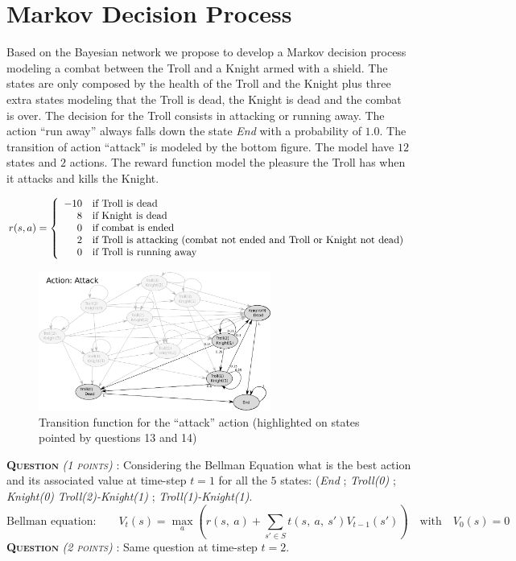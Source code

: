 \documentclass[a4paper, 10pt]{article}
\newcounter{QQ}
\newcommand{\question}[1]{ \medskip \sffamily \textsc{\textbf{\large Question \stepcounter{QQ} \arabic{QQ}} \emph{\small(#1)}} : }
\begin{document}
\section{Markov Decision Process}
  
  Based on the Bayesian network we propose to develop a Markov decision process modeling a combat between the Troll and a Knight armed with a shield.
  The states are only composed by the health of the Troll and the Knight plus three extra states modeling that the Troll is dead, the Knight is dead and the combat is over.
  The decision for the Troll consists in attacking or running away.
  The action ``run away'' always falls down the state \emph{End} with a probability of $1.0$.
  The transition of action ``attack'' is modeled by the bottom figure. 
  The model have $12$ states and $2$ actions.
  The reward function model the pleasure the Troll has when it attacks and kills the Knight.
  
  $$ r(s, a)= \left\{
  \begin{array}{r l}
      -10  & \text{if Troll is dead} \\
      8    & \text{if Knight is dead} \\
      0    & \text{if combat is ended} \\
      2    & \text{if Troll is attacking (combat not ended and Troll or Knight not dead)} \\
      0    & \text{if Troll is running away}
   \end{array}
   \right.$$

   \begin{figure}[!b]
    \centering
    \includegraphics[width=0.68\textwidth]{fig/Attacking}
    \caption{Transition function for the ``attack'' action (highlighted on states pointed by questions 13 and 14)}
   \end{figure}

\question{1 points}
  Considering the Bellman Equation what is the best action and its associated value at time-step $t=1$ for all the $5$ states:
  (\emph{End} ; \emph{Troll(0)} ; \emph{Knight(0)}
  \emph{Troll(2)-Knight(1)} ; \emph{Troll(1)-Knight(1)}.
  $$ \text{Bellman equation:} \qquad V_t(s)= \max_{a}\left(r(s,\ a) + \sum_{s'\in S} t(s,\ a,\ s') V_{t-1}(s') \right) \quad \text{with} \quad V_0(s)= 0  $$
\question{2 points} Same question at time-step $t=2$.
\end{document}
